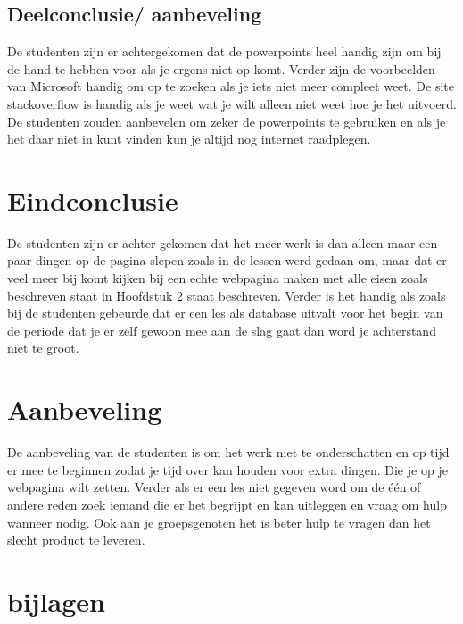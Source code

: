 \documentclass[11pt]{article}
\begin{document}
	\subsection{Deelconclusie/ aanbeveling}
	De studenten zijn er achtergekomen dat de powerpoints heel handig zijn om bij de hand te hebben voor als je ergens niet op komt. Verder zijn de voorbeelden van Microsoft handig om op te zoeken als je iets niet meer compleet weet. De site stackoverflow is handig als je weet wat je wilt alleen niet weet hoe je het uitvoerd. De studenten zouden aanbevelen om zeker de powerpoints te gebruiken en als je het daar niet in kunt vinden kun je altijd nog internet raadplegen. 
	\newpage
	
	\section{Eindconclusie}
	De studenten zijn er achter gekomen dat het meer werk is dan alleen maar een paar dingen op de pagina slepen zoals in de lessen werd gedaan om, maar dat er veel meer bij komt kijken bij een echte webpagina maken met alle eisen zoals beschreven staat in Hoofdstuk 2 staat beschreven. Verder is het handig als zoals bij de studenten gebeurde dat er een les als database uitvalt voor het begin van de periode dat je er zelf gewoon mee aan de slag gaat dan word je achterstand niet te groot.
	
	
	\section{Aanbeveling}
	De aanbeveling van de studenten is om het werk niet te onderschatten en op tijd er mee te beginnen zodat je tijd over kan houden voor extra dingen. Die je op je webpagina wilt zetten. Verder als er een les niet gegeven word om de één of andere reden zoek iemand die er het begrijpt en kan uitleggen en vraag om hulp wanneer nodig. Ook aan je groepsgenoten het is beter hulp te vragen dan het slecht product te leveren.  
	
	\newpage
	
	\section{bijlagen}
	
\end{document}
